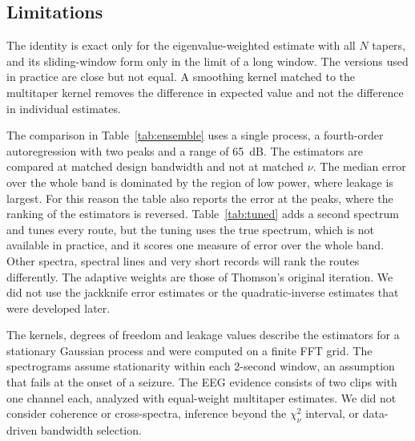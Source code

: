 \documentclass[10pt,twocolumn]{article}
\begin{document}
\subsection{Limitations}
\label{sec:limitations}
The identity is exact only for the eigenvalue-weighted estimate with all $N$ tapers, and its sliding-window form only in the limit of a long window. The versions used in practice are close but not equal. A smoothing kernel matched to the multitaper kernel removes the difference in expected value and not the difference in individual estimates.

The comparison in Table~\ref{tab:ensemble} uses a single process, a fourth-order autoregression with two peaks and a range of 65~dB. The estimators are compared at matched design bandwidth and not at matched $\nu$. The median error over the whole band is dominated by the region of low power, where leakage is largest. For this reason the table also reports the error at the peaks, where the ranking of the estimators is reversed. Table~\ref{tab:tuned} adds a second spectrum and tunes every route, but the tuning uses the true spectrum, which is not available in practice, and it scores one measure of error over the whole band. Other spectra, spectral lines and very short records will rank the routes differently. The adaptive weights are those of Thomson's original iteration. We did not use the jackknife error estimates \cite{thomson1991} or the quadratic-inverse estimates \cite{thomson1990} that were developed later.

The kernels, degrees of freedom and leakage values describe the estimators for a stationary Gaussian process and were computed on a finite FFT grid. The spectrograms assume stationarity within each 2-second window, an assumption that fails at the onset of a seizure. The EEG evidence consists of two clips with one channel each, analyzed with equal-weight multitaper estimates. We did not consider coherence or cross-spectra, inference beyond the $\chi^2_\nu$ interval, or data-driven bandwidth selection.
\end{document}

